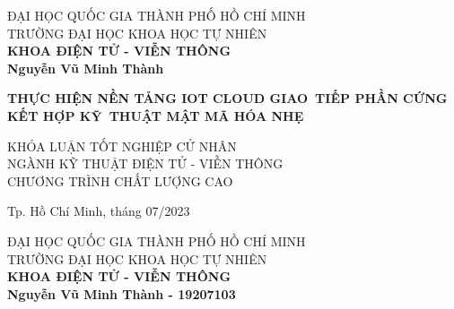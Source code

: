 \hypersetup{pageanchor=false}
\begin{titlepage}

\begin{center}
ĐẠI HỌC QUỐC GIA THÀNH PHỐ HỒ CHÍ MINH\\
TRƯỜNG ĐẠI HỌC KHOA HỌC TỰ NHIÊN\\
\textbf{KHOA ĐIỆN TỬ - VIỄN THÔNG}\\[2cm]


{ \Large \bfseries Nguyễn Vũ Minh Thành\\[2cm] } 


{ \Large \bfseries THỰC HIỆN NỀN TẢNG IOT CLOUD GIAO~TIẾP PHẦN CỨNG KẾT HỢP KỸ~THUẬT MẬT MÃ HÓA NHẸ \\[3cm]} 


\large KHÓA LUẬN TỐT NGHIỆP CỬ NHÂN\\
\large NGÀNH KỸ THUẬT ĐIỆN TỬ - VIỄN THÔNG\\
\large CHƯƠNG TRÌNH CHẤT LƯỢNG CAO\\



\vfill
Tp. Hồ Chí Minh, tháng 07/2023

\end{center}

\pagebreak



\begin{center}
ĐẠI HỌC QUỐC GIA THÀNH PHỐ HỒ CHÍ MINH\\
TRƯỜNG ĐẠI HỌC KHOA HỌC TỰ NHIÊN\\
\textbf{KHOA ĐIỆN TỬ - VIỄN THÔNG}\\[2cm]


{\large \bfseries Nguyễn Vũ Minh Thành - 19207103\\[2cm]}


\end{center}
\end{titlepage}
